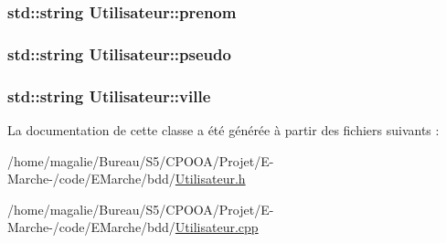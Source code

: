 \hypertarget{class_utilisateur_a7cbd4b405cdff4fed665d74ddca1a61f}{
\subsubsection[{prenom}]{\setlength{\rightskip}{0pt plus 5cm}std\-::string Utilisateur\-::prenom\hspace{0.3cm}{\ttfamily [protected]}}}\label{class_utilisateur_a7cbd4b405cdff4fed665d74ddca1a61f}
\hypertarget{class_utilisateur_acefb31a3f7e204657236a73770e4b36c}{
\subsubsection[{pseudo}]{\setlength{\rightskip}{0pt plus 5cm}std\-::string Utilisateur\-::pseudo\hspace{0.3cm}{\ttfamily [protected]}}}\label{class_utilisateur_acefb31a3f7e204657236a73770e4b36c}
\hypertarget{class_utilisateur_ad5a26fdf60b16be6d077aecd582edaab}{
\subsubsection[{ville}]{\setlength{\rightskip}{0pt plus 5cm}std\-::string Utilisateur\-::ville\hspace{0.3cm}{\ttfamily [protected]}}}\label{class_utilisateur_ad5a26fdf60b16be6d077aecd582edaab}


La documentation de cette classe a été générée à partir des fichiers suivants \-:\begin{DoxyCompactItemize}
\item 
/home/magalie/\-Bureau/\-S5/\-C\-P\-O\-O\-A/\-Projet/\-E-\/\-Marche-\//code/\-E\-Marche/bdd/\hyperlink{_utilisateur_8h}{Utilisateur.\-h}\item 
/home/magalie/\-Bureau/\-S5/\-C\-P\-O\-O\-A/\-Projet/\-E-\/\-Marche-\//code/\-E\-Marche/bdd/\hyperlink{_utilisateur_8cpp}{Utilisateur.\-cpp}\end{DoxyCompactItemize}
